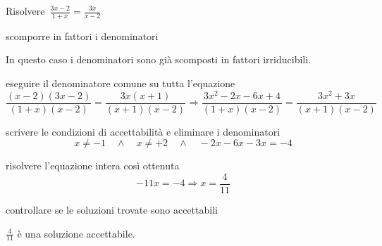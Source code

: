  \begin{esempio}
Risolvere~$\frac{3x-2}{1+x}=\frac{3x}{x-2}$
 
\begin{enumerate*}
\item scomporre in fattori i denominatori

In questo caso i denominatori sono già scomposti in fattori irriducibili.

\item eseguire il denominatore comune su tutta l'equazione
\[\frac{(x-2)(3x-2)}{(1+x)(x-2)}=\frac{3x(x+1)}{(x+1)(x-2)}\Rightarrow
\frac{3x^{2}-2x-6x+4}{(1+x)(x-2)}=\frac{3x^2+3x}{(x+1)(x-2)}\]

\item scrivere le condizioni di accettabilità e eliminare i denominatori
\[x \neq -1 \quad \wedge \quad x \neq +2 \quad \wedge \quad 
-2x -6x -3x = -4\]
\item risolvere l'equazione intera così ottenuta
\[-11x = -4 \Rightarrow x=\frac{4}{11}\]
\item controllare se le soluzioni trovate sono accettabili

\centering $\frac{4}{11}$ è una soluzione accettabile.

\end{enumerate*}
 \end{esempio}


